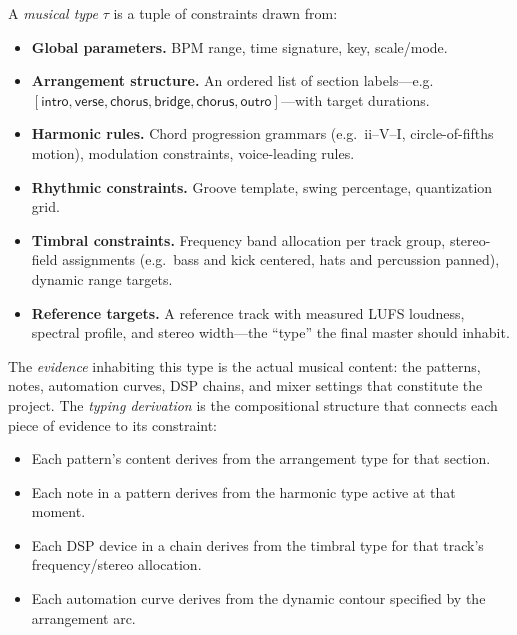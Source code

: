\begin{definition}
\label{def:musical-type}
A \emph{musical type} $\tau$ is a tuple of constraints drawn from:
\begin{itemize}
  \item \textbf{Global parameters.}\;
        BPM range, time signature, key, scale/mode.
  \item \textbf{Arrangement structure.}\;
        An ordered list of section labels---e.g.\
        $[\mathsf{intro}, \mathsf{verse}, \mathsf{chorus},
         \mathsf{bridge}, \mathsf{chorus}, \mathsf{outro}]$---with
        target durations.
  \item \textbf{Harmonic rules.}\;
        Chord progression grammars (e.g.\ $\mathrm{ii}$--$\mathrm{V}$--$\mathrm{I}$,
        circle-of-fifths motion), modulation constraints,
        voice-leading rules.
  \item \textbf{Rhythmic constraints.}\;
        Groove template, swing percentage, quantization grid.
  \item \textbf{Timbral constraints.}\;
        Frequency band allocation per track group, stereo-field
        assignments (e.g.\ bass and kick centered, hats and
        percussion panned), dynamic range targets.
  \item \textbf{Reference targets.}\;
        A reference track with measured LUFS loudness,
        spectral profile, and stereo width---the ``type'' the
        final master should inhabit.
\end{itemize}
\end{definition}

The \emph{evidence} inhabiting this type is the actual musical
content: the patterns, notes, automation curves, DSP chains, and
mixer settings that constitute the project.  The \emph{typing
derivation} is the compositional structure that connects each piece
of evidence to its constraint:

\begin{itemize}
  \item Each pattern's content derives from the arrangement type
        for that section.
  \item Each note in a pattern derives from the harmonic type
        active at that moment.
  \item Each DSP device in a chain derives from the timbral type
        for that track's frequency/stereo allocation.
  \item Each automation curve derives from the dynamic contour
        specified by the arrangement arc.
\end{itemize}

